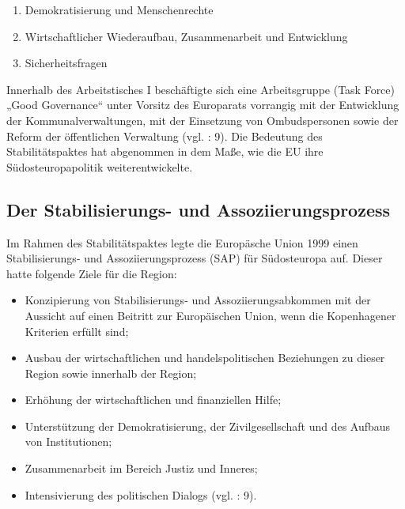 \begin{enumerate}[label=Tisch {\roman*}:,align=left,  leftmargin=*]
\item Demokratisierung und Menschenrechte
\item Wirtschaftlicher Wiederaufbau, Zusammenarbeit und Entwicklung
\item Sicherheitsfragen
\end{enumerate}
Innerhalb des Arbeitstisches I beschäftigte sich eine Arbeitsgruppe (Task Force) „Good Governance“ unter Vorsitz des Europarats vorrangig mit der Entwicklung der Kommunalverwaltungen, mit der Einsetzung von Ombudspersonen sowie der Reform der öffentlichen Verwaltung (vgl. \cite{calic01}: 9). Die Bedeutung des Stabilitätspaktes hat abgenommen in dem Maße, wie die EU ihre Südosteuropapolitik weiterentwickelte.

\subsection{Der Stabilisierungs- und Assoziierungsprozess}
Im Rahmen des Stabilitätspaktes legte die Europäsche Union 1999 einen Stabilisierungs- und Assoziierungsprozess (SAP) für Südosteuropa auf. Dieser hatte folgende Ziele für die Region:
\begin{itemize}
\item Konzipierung von Stabilisierungs- und Assoziierungsabkommen mit der Aussicht auf einen
Beitritt zur Europäischen Union, wenn die Kopenhagener Kriterien erfüllt sind;
\item Ausbau der wirtschaftlichen und handelspolitischen Beziehungen zu dieser Region sowie innerhalb der Region;
\item Erhöhung der wirtschaftlichen und finanziellen Hilfe;
\item Unterstützung der Demokratisierung, der Zivilgesellschaft und des Aufbaus von Institutionen;
\item Zusammenarbeit im Bereich Justiz und Inneres;
\item Intensivierung des politischen Dialogs (vgl. \cite{marwedel}: 9).
\end{itemize}

